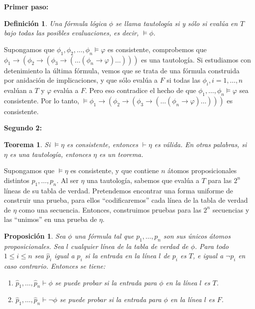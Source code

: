 \documentclass[18pt]{article}
\newtheorem{teor}{Teorema}
\newtheorem{prop}{Proposición}
\newtheorem{Def}{Definición}
\begin{document}
\textbf{Primer paso:}


\begin{Def}
Una fórmula lógica $\phi$ se llama tautología si y sólo si evalúa en $T$ bajo todas las posibles evaluaciones, es decir, $\models \phi$. 
\end{Def}

Supongamos que $\phi_1,\phi_2,\dots, \phi_n \models \varphi$ es consistente, comprobemos que $\phi_1 \rightarrow (\phi_2 \rightarrow (\phi_3 \rightarrow (\dots (\phi_n \rightarrow \varphi )\dots )))$ es una tautología. Si estudiamos con detenimiento la última fórmula, vemos que se trata de una fórmula construida por anidación de implicaciones, y que sólo evalúa a $F$ si todas las $\phi_i, i=1,\dots, n$ evalúan a $T$ y $\varphi$ evalúa a $F$. Pero eso contradice el hecho de que $\phi_1,\dots, \phi_n \models \varphi$ sea consistente. Por lo tanto, $\models \phi_1\rightarrow (\phi_2 \rightarrow (\phi_3 \rightarrow (\dots (\phi_n \rightarrow \varphi )\dots )))$ es consistente.

\vspace{2mm}
\textbf{Segundo 2:}


\begin{teor}
  Si $\models \eta$ es consistente, entonces $\vdash \eta$ es válida. En otras palabras, si $\eta$ es una tautología, entonces $\eta$ es un teorema. 
\end{teor}

Supongamos que $\models \eta$ es consistente, y que contiene $n$ átomos proposicionales distintos $p_1,\dots, p_n$. Al ser $\eta$ una tautología, sabemos que evalúa a $T$ para las $2^n$ líneas de su tabla de verdad. Pretendemos encontrar una forma uniforme de construir una prueba, para ellos ``codificaremos'' cada línea de la tabla de verdad de $\eta$ como una secuencia. Entonces, construimos pruebas para las $2^n$ secuencias y las ``unimos'' en una prueba de $\eta$.

\begin{prop}
  Sea $\phi$ una fórmula tal que $p_1,\dots, p_n$ son sus únicos átomos proposicionales. Sea $l$ cualquier línea de la tabla de verdad de $\phi$. Para todo $1\le i \le n$ sea $\hat{p}_i$ igual a $p_i$ si la entrada en la línea $l$ de $p_i$ es $T$, e igual a $\neg p_i$ en caso contrario. Entonces se tiene:
  \begin{enumerate}
  \item $\hat{p}_1,\dots,\hat{p}_n \vdash \phi$ se puede probar si la entrada para $\phi$ en la línea $l$ es $T$.
  \item $\hat{p}_1,\dots,\hat{p}_n \vdash \neg \phi$ se puede probar si la entrada para $\phi$ en la línea $l$ es $F$. 
  \end{enumerate}
\end{prop}
\end{document}
